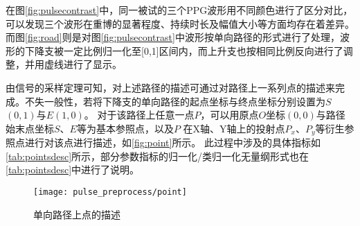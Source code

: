 在图\autoref{fig:pulsecontrast}中，同一被试的三个PPG波形用不同颜色进行了区分对比，可以发现三个波形在重博的显著程度、持续时长及幅值大小等方面均存在着差异。
而图\autoref{fig:road}则是对图\autoref{fig:pulsecontrast}中波形按单向路径的形式进行了处理，波形的下降支被一定比例归一化至[0,1]区间内，而上升支也按相同比例反向进行了调整，并用虚线进行了显示。

由信号的采样定理可知，对上述路径的描述可通过对路径上一系列点的描述来完成。不失一般性，若将下降支的单向路径的起点坐标与终点坐标分别设置为$S$$(0,1)$与$E$$(1,0)$。
对于该路径上任意一点$P$，可以用原点$O$坐标$(0,0)$与路径始末点坐标$S$、$E$等为基本参照点，以及$P$
在X轴、Y轴上的投射点$P_x$、$P_y$等衍生参照点进行对该点进行描述，如\autoref{fig:point}所示。
此过程中涉及的具体指标如\autoref{tab:pointsdesc}所示，部分参数指标的归一化/类归一化无量纲形式也在\autoref{tab:pointsdesc}中进行了说明。

\begin{figure}[htbp]
  \centering
  \texttt{[image: pulse\_preprocess/point]}
  \caption{\label{fig:point}单向路径上点的描述}
\end{figure}

